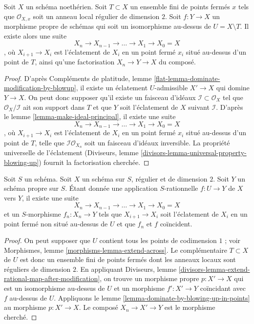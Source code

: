 \begin{lemma} \label{lemma-dominate-by-blowing-up-in-points} Soit $X$ un schéma noethérien. Soit $T \subset X$ un ensemble fini de points fermés $x$ tels que $\mathcal{O}_{X, x}$ soit un anneau local régulier de dimension $2$. Soit $f : Y \to X$ un morphisme propre de schémas qui soit un isomorphisme au-dessus de $U = X \setminus T$. Il existe alors une suite $$
X_n \to X_{n - 1} \to \ldots \to X_1 \to X_0 = X
$$, où $X_{i + 1} \to X_i$ est l'éclatement de $X_i$ en un point fermé $x_i$ situé au-dessus d'un point de $T$, ainsi qu'une factorisation $X_n \to Y \to X$ du composé. \end{lemma}

\begin{proof} D'après Compléments de platitude, lemme \ref{flat-lemma-dominate-modification-by-blowup}, il existe un éclatement $U$-admissible $X' \to X$ qui domine $Y \to X$. On peut donc supposer qu'il existe un faisceau d'idéaux $\mathcal{I} \subset \mathcal{O}_X$ tel que $\mathcal{O}_X/\mathcal{I}$ ait son support dans $T$ et que $Y$ soit l'éclatement de $X$ suivant $\mathcal{I}$. D'après le lemme \ref{lemma-make-ideal-principal}, il existe une suite $$
X_n \to X_{n - 1} \to \ldots \to X_1 \to X_0 = X
$$, où $X_{i + 1} \to X_i$ est l'éclatement de $X_i$ en un point fermé $x_i$ situé au-dessus d'un point de $T$, telle que $\mathcal{I}\mathcal{O}_{X_n}$ soit un faisceau d'idéaux inversible. La propriété universelle de l'éclatement (Diviseurs, lemme \ref{divisors-lemma-universal-property-blowing-up}) fournit la factorisation cherchée. \end{proof}

\begin{lemma} \label{lemma-extend-rational-map-blowing-up} Soit $S$ un schéma. Soit $X$ un schéma sur $S$, régulier et de dimension $2$. Soit $Y$ un schéma propre sur $S$. Étant donnée une application $S$-rationnelle $f : U \to Y$ de $X$ vers $Y$, il existe une suite $$
X_n \to X_{n - 1} \to \ldots \to X_1 \to X_0 = X
$$ et un $S$-morphisme $f_n : X_n \to Y$ tels que $X_{i + 1} \to X_i$ soit l'éclatement de $X_i$ en un point fermé non situé au-dessus de $U$ et que $f_n$ et $f$ coïncident. \end{lemma}

\begin{proof} On peut supposer que $U$ contient tous les points de codimension $1$ ; voir Morphismes, lemme \ref{morphisms-lemma-extend-across}. Le complémentaire $T \subset X$ de $U$ est donc un ensemble fini de points fermés dont les anneaux locaux sont réguliers de dimension $2$. En appliquant Diviseurs, lemme \ref{divisors-lemma-extend-rational-map-after-modification}, on trouve un morphisme propre $p : X' \to X$ qui est un isomorphisme au-dessus de $U$ et un morphisme $f' : X' \to Y$ coïncidant avec $f$ au-dessus de $U$. Appliquons le lemme \ref{lemma-dominate-by-blowing-up-in-points} au morphisme $p : X' \to X$. Le composé $X_n \to X' \to Y$ est le morphisme cherché. \end{proof}






